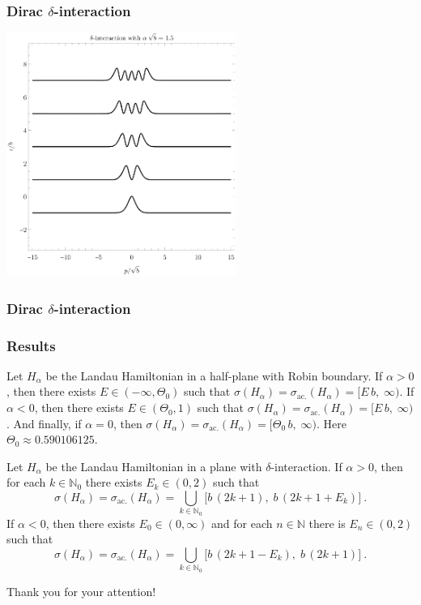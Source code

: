 \documentclass{beamer}
\newcommand{\N}{\ensuremath{\mathbb N}}
\newcommand{\Sp}{\ensuremath{\sigma}}
\newcommand{\SpAc}{\ensuremath{\sigma_{\mathrm{ac.}}}}
\begin{document}
\begin{frame}
    \frametitle{Dirac $\delta$-interaction}
    \centering
    \includegraphics[height=225pt]{plots/dirac18.pdf}
\end{frame}

\begin{frame}
    \frametitle{Dirac $\delta$-interaction}
    \centering
\end{frame}

\begin{frame}
    \frametitle{Results}
    \small
    Let $H_\alpha$ be the Landau Hamiltonian in a half-plane with Robin boundary. If $\alpha > 0$, then there exists $E \in (-\infty, \Theta_0)$ such that $ \Sp(H_\alpha) = \SpAc(H_\alpha) = [E \, b, \; \infty )$.
    If $\alpha < 0$, then there exists $E \in (\Theta_0, 1)$ such that $\Sp(H_\alpha) = \SpAc(H_\alpha) = [E \, b, \; \infty )$.
    And finally, if $\alpha = 0$, then $\Sp(H_\alpha) = \SpAc(H_\alpha) = [\Theta_0 \, b, \; \infty )$. Here $\Theta_0 \approx 0.590106125$.

    \bigskip

    Let $H_\alpha$ be the Landau Hamiltonian in a plane with $\delta$-interaction. If $\alpha>0$, then for each $k \in \N_0$ there exists $E_k \in (0, 2)$ such that
    \begin{equation*}
        \Sp(H_\alpha) = \SpAc(H_\alpha) =
        \bigcup_{k \in \N_0}
        \big[ b \, (2k+1), \; b \, (2k+1+E_k) \big]
        \: .
    \end{equation*}
    If $\alpha<0$, then there exists $E_0 \in (0, \infty)$ and for each $n \in \N$ there is $E_n \in (0, 2)$ such that
    \begin{equation*}
        \Sp(H_\alpha) = \SpAc(H_\alpha) =
        \bigcup_{k \in \N_0}
        \big[ b \, (2k+1-E_k), \; b \, (2k+1) \big]
        \: .
    \end{equation*}
\end{frame}

\begin{frame}
    \centering \Large
    Thank you for your attention!
\end{frame}
\end{document}

